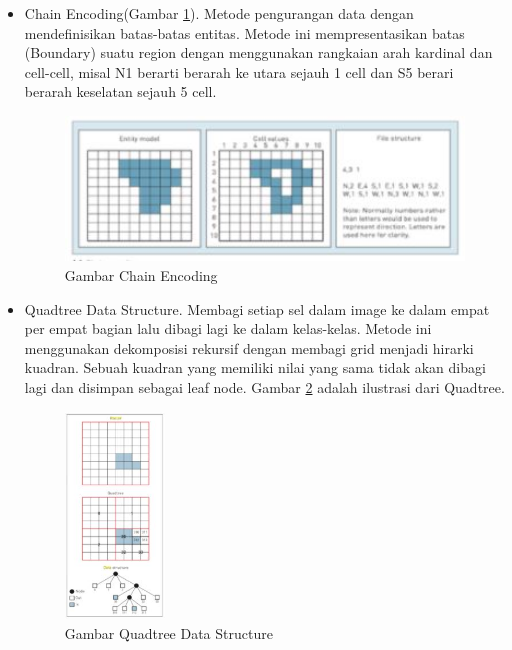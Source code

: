 \begin{itemize}
\begin{figure} [ht]
				\end{figure}

		\item  Chain Encoding(Gambar \ref{chainencoding}). Metode pengurangan data dengan mendefinisikan batas-batas entitas. Metode ini mempresentasikan batas (Boundary) suatu region dengan menggunakan rangkaian arah kardinal dan cell-cell, misal N1 berarti berarah ke utara sejauh 1 cell dan S5 berari berarah keselatan sejauh 5 cell.
				\begin{figure} [ht]
					\centerline{\includegraphics[width=1\textwidth]{figures/chainencoding.JPG}}
					\caption{Gambar Chain Encoding}
					\label{chainencoding}
				\end{figure}

		\item  Quadtree Data Structure. Membagi setiap sel dalam image ke dalam empat per empat bagian lalu dibagi lagi ke dalam kelas-kelas. Metode ini menggunakan dekomposisi rekursif dengan membagi grid menjadi hirarki kuadran. Sebuah kuadran yang memiliki nilai yang sama tidak akan dibagi lagi dan disimpan sebagai leaf node. Gambar \ref{quadtreedatastructure} adalah ilustrasi dari Quadtree.
				\begin{figure} [ht]
					\centerline{\includegraphics[width=0.25\textwidth]{figures/quadtreedatastructure.JPG}}
					\caption{Gambar Quadtree Data Structure}
					\label{quadtreedatastructure}
				\end{figure}
	\end{itemize}

